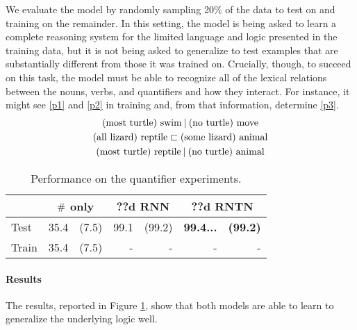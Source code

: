 We evaluate the model by randomly sampling 20\% of the data to
test on and training on the remainder. In this setting, the model is being asked to learn a
complete reasoning system for the limited language and logic presented
in the training data, but it is not being asked to generalize to test
examples that are substantially different from those it was trained
on. Crucially, though, to succeed on this task, the model must be able
to recognize all of the lexical relations between the nouns, verbs,
and quantifiers and how they interact. For instance, it might see
\eqref{p1} and \eqref{p2} in training and, from that information,
determine \eqref{p3}.
%
%
\begin{gather}
  \text{(most turtle) swim} \mathbin{|} \text{(no turtle) move}\label{p1}
  \\
  \text{(all lizard) reptile} \sqsubset  \text{(some lizard) animal}\label{p2}
  \\
  \text{(most turtle) reptile} \mathbin{|} \text{(no turtle) animal}\label{p3}
\end{gather}
%
%
\begin{table}[tp]
  \centering \small
  \begin{tabular}{ l r@{ \ }r r@{ \ }r r@{ \ }r }
    \toprule
    ~&\multicolumn{2}{c}{$\mathbin{\#}$ only} & \multicolumn{2}{c}{??d RNN}  & \multicolumn{2}{c}{??d RNTN}\\
    \midrule
    Test & 35.4 &(7.5) &	99.1&(99.2)& \textbf{99.4...} & \textbf{(99.2)}\\
    Train & 35.4 &(7.5) &	-&	-&	-&	-\\	
    \bottomrule
  \end{tabular}
  \caption{Performance on the quantifier experiments.}
  \label{qresultstable}
\end{table} 
%
%
\paragraph{Results} The results, reported in Figure \ref{qresultstable}, show that both models are able to learn to generalize the underlying logic well.

